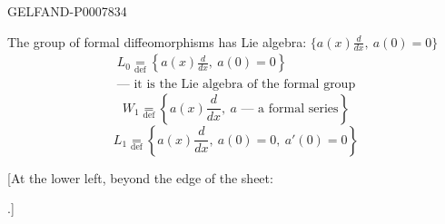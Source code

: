 \begin{GelfandAdjacentEvidence}{GELFAND-P000783}{4}

The group of formal diffeomorphisms has Lie algebra:
\(\{a(x)\tfrac{d}{dx},\ a(0)=0\}\)
\begin{equation}
\begin{gathered}
L_0\underset{\mathrm{def}}{=}
\left\{a(x)\frac{d}{dx},\ a(0)=0\right\}\\
\text{--- it is the Lie algebra of the formal group}
\end{gathered}\tag{7}
\end{equation}
\begin{equation}
W_1\underset{\mathrm{def}}{=}
\left\{a(x)\frac{d}{dx},\ a\text{ --- a formal series}\right\}\tag{8}
\end{equation}
\begin{equation}
L_1\underset{\mathrm{def}}{=}
\left\{a(x)\frac{d}{dx},\ a(0)=0,\ a'(0)=0\right\}\tag{9}
\end{equation}

[At the lower left, beyond the edge of the sheet:
\end{GelfandAdjacentEvidence}
.]


